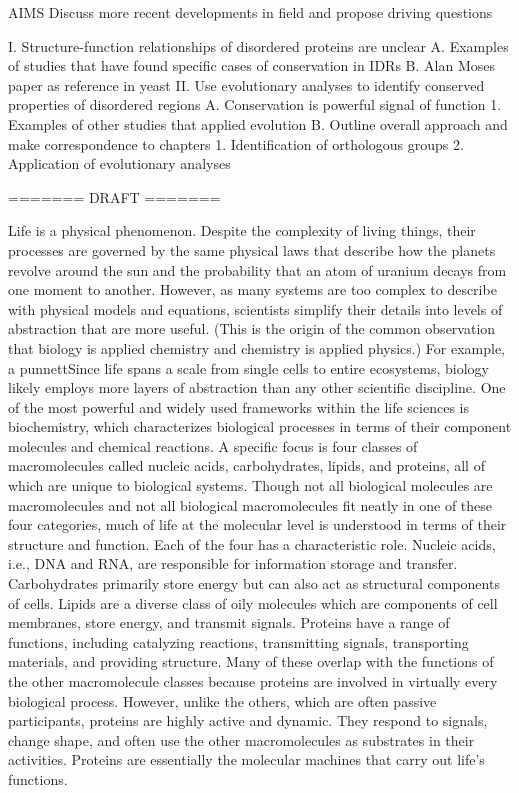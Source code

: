 AIMS
Discuss more recent developments in field and propose driving questions

I. Structure-function relationships of disordered proteins are unclear
    A. Examples of studies that have found specific cases of conservation in IDRs
    B. Alan Moses paper as reference in yeast
II. Use evolutionary analyses to identify conserved properties of disordered regions
    A. Conservation is powerful signal of function
        1. Examples of other studies that applied evolution
    B. Outline overall approach and make correspondence to chapters
        1. Identification of orthologous groups
        2. Application of evolutionary analyses

======= DRAFT =======

Life is a physical phenomenon. Despite the complexity of living things, their processes are governed by the same physical laws that describe how the planets revolve around the sun and the probability that an atom of uranium decays from one moment to another. However, as many systems are too complex to describe with physical models and equations, scientists simplify their details into levels of abstraction that are more useful. (This is the origin of the common observation that biology is applied chemistry and chemistry is applied physics.) For example, a punnettSince life spans a scale from single cells to entire ecosystems, biology likely employs more layers of abstraction than any other scientific discipline. One of the most powerful and widely used frameworks within the life sciences is biochemistry, which characterizes biological processes in terms of their component molecules and chemical reactions. A specific focus is four classes of macromolecules called nucleic acids, carbohydrates, lipids, and proteins, all of which are unique to biological systems. Though not all biological molecules are macromolecules and not all biological macromolecules fit neatly in one of these four categories, much of life at the molecular level is understood in terms of their structure and function. Each of the four has a characteristic role. Nucleic acids, i.e., DNA and RNA, are responsible for information storage and transfer. Carbohydrates primarily store energy but can also act as structural components of cells. Lipids are a diverse class of oily molecules which are components of cell membranes, store energy, and transmit signals. Proteins have a range of functions, including catalyzing reactions, transmitting signals, transporting materials, and providing structure. Many of these overlap with the functions of the other macromolecule classes because proteins are involved in virtually every biological process. However, unlike the others, which are often passive participants, proteins are highly active and dynamic. They respond to signals, change shape, and often use the other macromolecules as substrates in their activities. Proteins are essentially the molecular machines that carry out life's functions.

